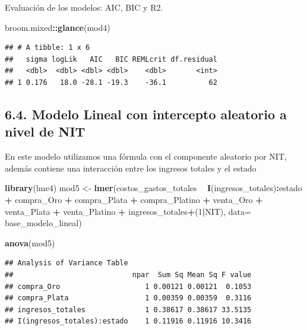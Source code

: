 \documentclass[
  11pt,
  a4paper,
]{book}
\newenvironment{Shaded}{\begin{snugshade}}{\end{snugshade}}
\newcommand{\DataTypeTok}[1]{\textcolor[rgb]{0.13,0.29,0.53}{#1}}
\newcommand{\DecValTok}[1]{\textcolor[rgb]{0.00,0.00,0.81}{#1}}
\newcommand{\KeywordTok}[1]{\textcolor[rgb]{0.13,0.29,0.53}{\textbf{#1}}}
\newcommand{\NormalTok}[1]{#1}
\newcommand{\OperatorTok}[1]{\textcolor[rgb]{0.81,0.36,0.00}{\textbf{#1}}}
\newcommand{\StringTok}[1]{\textcolor[rgb]{0.31,0.60,0.02}{#1}}
\begin{document}
Evaluación de los modelos: AIC, BIC y R2.

\begin{Shaded}
\begin{Highlighting}[]
\NormalTok{broom.mixed}\OperatorTok{::}\KeywordTok{glance}\NormalTok{(mod4)}
\end{Highlighting}
\end{Shaded}

\begin{verbatim}
## # A tibble: 1 x 6
##   sigma logLik   AIC   BIC REMLcrit df.residual
##   <dbl>  <dbl> <dbl> <dbl>    <dbl>       <int>
## 1 0.176   18.0 -28.1 -19.3    -36.1          62
\end{verbatim}

\hypertarget{modelo-lineal-con-intercepto-aleatorio-a-nivel-de-nit}{%
\subsection{6.4. Modelo Lineal con intercepto aleatorio a nivel de
NIT}\label{modelo-lineal-con-intercepto-aleatorio-a-nivel-de-nit}}

En este modelo utilizamos una fórmula con el componente aleatorio por
NIT, además contiene una interacción entre los ingresos totales y el
estado

\begin{Shaded}
\begin{Highlighting}[]
\KeywordTok{library}\NormalTok{(lme4)}
\NormalTok{mod5 <-}\StringTok{ }\KeywordTok{lmer}\NormalTok{(costos_gastos_totales }\OperatorTok{~}\StringTok{ }\KeywordTok{I}\NormalTok{(ingresos_totales)}\OperatorTok{:}\NormalTok{estado }\OperatorTok{+}\StringTok{  }\NormalTok{compra_Oro }
             \OperatorTok{+}\StringTok{ }\NormalTok{compra_Plata }\OperatorTok{+}\StringTok{ }\NormalTok{compra_Platino }\OperatorTok{+}\StringTok{ }\NormalTok{venta_Oro }\OperatorTok{+}\StringTok{ }\NormalTok{venta_Plata }\OperatorTok{+}\StringTok{ }
\StringTok{               }\NormalTok{venta_Platino }\OperatorTok{+}\StringTok{ }\NormalTok{ingresos_totales}\OperatorTok{+}\NormalTok{(}\DecValTok{1}\OperatorTok{|}\NormalTok{NIT), }
             \DataTypeTok{data=}\NormalTok{ base_modelo_lineal) }

\KeywordTok{anova}\NormalTok{(mod5)}
\end{Highlighting}
\end{Shaded}

\begin{verbatim}
## Analysis of Variance Table
##                            npar  Sum Sq Mean Sq F value
## compra_Oro                    1 0.00121 0.00121  0.1053
## compra_Plata                  1 0.00359 0.00359  0.3116
## ingresos_totales              1 0.38617 0.38617 33.5135
## I(ingresos_totales):estado    1 0.11916 0.11916 10.3416
\end{verbatim}
\end{document}
